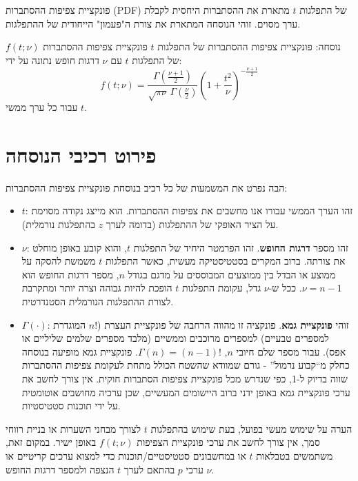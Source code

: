 \documentclass[12pt]{article}
\newcommand{\enquote}[1]{\textquotedblleft #1\textquotedblright}
\begin{document}
פונקציית צפיפות ההסתברות (PDF) של התפלגות \(t\) מתארת את ההסתברות היחסית לקבלת ערך מסוים. זוהי הנוסחה המתארת את צורת ה"פעמון" הייחודית של ההתפלגות.

\begin{keyconceptBox}{נוסחה: פונקציית צפיפות ההסתברות של התפלגות \(t\)}
פונקציית צפיפות ההסתברות \(f(t; \nu)\) של התפלגות \(t\) עם \(\nu\) דרגות חופש נתונה על ידי:
\[ f(t; \nu) = \frac{\Gamma\left(\frac{\nu+1}{2}\right)}{\sqrt{\pi\nu}\,\Gamma\left(\frac{\nu}{2}\right)}\left(1 + \frac{t^2}{\nu}\right)^{-\frac{\nu+1}{2}} \]
עבור כל ערך ממשי \(t\).
\end{keyconceptBox}

\section*{פירוט רכיבי הנוסחה}

הבה נפרט את המשמעות של כל רכיב בנוסחת פונקציית צפיפות ההסתברות:

\begin{itemize}
    \item \textbf{\(t\)}: זהו הערך הממשי עבורו אנו מחשבים את צפיפות ההסתברות. הוא מייצג נקודה מסוימת על הציר האופקי של ההתפלגות (בדומה לערך \(z\) בהתפלגות נורמלית).

    \item \textbf{\(\nu\)}: זהו מספר \textbf{דרגות החופש}. זהו הפרמטר היחיד של התפלגות \(t\), והוא קובע באופן מוחלט את צורתה. ברוב המקרים בסטטיסטיקה מעשית, כאשר התפלגות \(t\) משמשת להסקה על ממוצע או הבדל בין ממוצעים המבוססים על מדגם בגודל \(n\), מספר דרגות החופש הוא \(\nu = n-1\). ככל ש-\(\nu\) גדל, עקומת התפלגות \(t\) הופכת להיות גבוהה וצרה יותר ומתקרבת לצורת ההתפלגות הנורמלית הסטנדרטית.

    \item \textbf{\(\Gamma(\cdot)\)}: זוהי \textbf{פונקציית גמא}. פונקציה זו מהווה הרחבה של פונקציית העצרת (\(n!\) המוגדרת למספרים טבעיים) למספרים מרוכבים וממשיים (מלבד מספרים שלמים שליליים או אפס). עבור מספר שלם חיובי \(n\), \(\Gamma(n) = (n-1)!\). פונקציית גמא מופיעה בנוסחה כחלק מ\enquote{קבוע נרמול} - גורם שמוודא שהשטח הכולל מתחת לעקומת צפיפות ההסתברות שווה בדיוק ל-1, כפי שנדרש מכל פונקציית צפיפות הסתברות חוקית. אין צורך לחשב את ערכי פונקציית גמא באופן ידני ברוב היישומים המעשיים, שכן ערכיה מחושבים אוטומטית על ידי תוכנות סטטיסטיות.
\end{itemize}

\begin{remarkBox}{הערה על שימוש מעשי}
בפועל, בעת שימוש בהתפלגות \(t\) לצורך מבחני השערות או בניית רווחי סמך, אין צורך לחשב את ערכי פונקציית הצפיפות \(f(t; \nu)\) באופן ישיר. במקום זאת, משתמשים בטבלאות \(t\) או במחשבונים סטטיסטיים/תוכנות כדי למצוא ערכים קריטיים או ערכי \(p\) בהתאם לערך \(t\) הנצפה ולמספר דרגות החופש \(\nu\).
\end{remarkBox}
\end{document}
